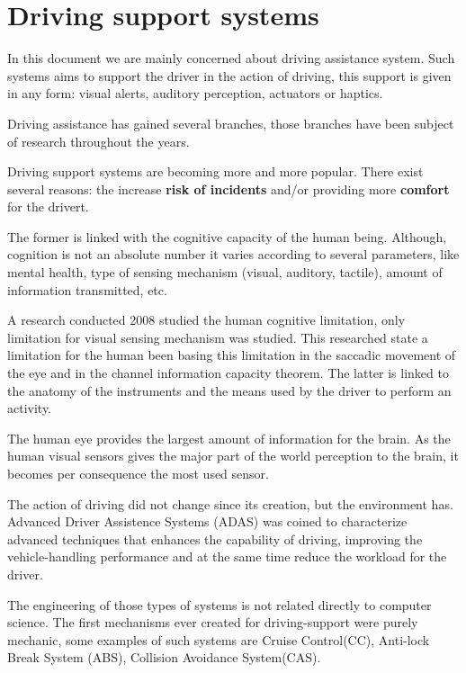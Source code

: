 \section{Driving support systems}

In this document we are mainly concerned about driving assistance system. Such systems aims to support the driver in the action of driving, this support is given in any form: visual alerts, auditory perception, actuators or haptics\cite{riener2010sensor}.

Driving assistance has gained several branches, those branches have been subject of research throughout the years.

Driving support systems are becoming more and more popular. There exist several reasons: the increase \textbf{risk of incidents} and/or providing more \textbf{comfort} for the drivert.

The former is linked with the cognitive capacity of the human being. Although, cognition is not an absolute number it varies according to several parameters, like mental health, type of sensing mechanism (visual, auditory, tactile), amount of information transmitted, etc. 

A research conducted 2008 studied the human cognitive limitation, only limitation for visual sensing mechanism was studied\cite{LautarutisV}. This researched state a limitation for the human been  basing this limitation in the saccadic movement of the eye and in the channel information capacity theorem. The latter is linked to the anatomy of the instruments and the means used by the driver to perform an activity.

The human eye provides the largest amount of information for the brain. As the human visual sensors gives the major part of the world perception to the brain, it becomes per consequence the most used sensor.

The action of driving did not change since its creation, but the environment has. Advanced Driver Assistence Systems (ADAS) was coined to characterize advanced techniques that enhances the capability of driving, improving the vehicle-handling performance and at the same time reduce the workload for the driver\cite{riener2010sensor}.

The engineering of those types of systems is not related directly to computer science. The first mechanisms ever created for driving-support were purely mechanic, some examples of such systems are Cruise Control(CC), Anti-lock Break System (ABS), Collision Avoidance System(CAS).

